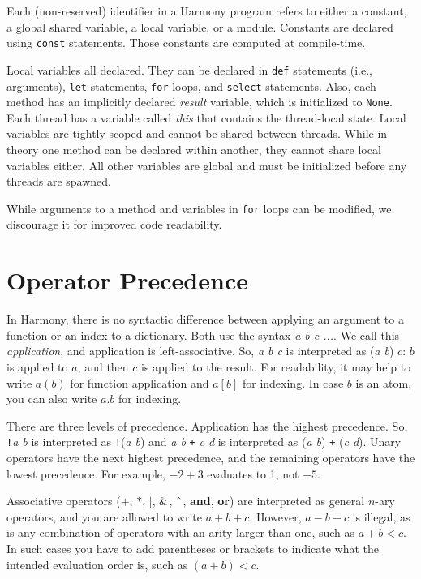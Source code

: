 \documentclass{report}
\begin{document}
Each (non-reserved) identifier in a Harmony program refers to either
a constant, a global shared variable, a local variable, or a module.
Constants are declared using \texttt{const} statements.
Those constants are computed at compile-time.

Local variables all declared.  They can be declared in
\texttt{def} statements (i.e., arguments),
\texttt{let} statements, \texttt{for} loops, and \texttt{select} statements.
Also, each method has an implicitly declared
\textit{result} variable, which is initialized to \texttt{None}.
Each thread has a variable called \textit{this} that contains
the thread-local state.
Local variables are tightly scoped and cannot be shared
between threads.
While in theory one method can be declared within another,
they cannot share local variables either.
All other variables are global and must be initialized
before any threads are spawned.

While arguments to a method and variables in \texttt{for} loops
can be modified, we discourage it for improved code readability.

\section{Operator Precedence}

In Harmony, there is no syntactic difference between applying an argument to a function
or an index to a dictionary.  Both use the syntax \textit{a b c ...}.
We call this \emph{application}, and application is left-associative.
So, \textit{a b c} is interpreted as (\textit{a b}) $c$: $b$ is applied to $a$,
and then $c$ is applied to the result.
For readability, it may help to write $a(b)$ for function application and
$a[b]$ for indexing.  In case $b$ is an atom, you can also write $a.b$ for indexing.

There are three levels of precedence.
Application has the highest precedence.  So, \texttt{!}\textit{a b} is interpreted as
\texttt{!}(\textit{a b}) and \textit{a b} \texttt{+} \textit{c d} is interpreted as
(\textit{a b}) \texttt{+} (\textit{c d}).
Unary operators have the next highest precedence,
and the remaining operators have the lowest precedence.
For example, $-2 + 3$ evaluates to 1, not $-5$.

Associative operators ($+$, $*$, $|$, $\string&$, $\string^$, \textbf{and}, \textbf{or})
are interpreted as general $n$-ary operators, and you are allowed to write
$a + b + c$.  However, $a - b - c$ is illegal, as is any combination of operators with an
arity larger than one, such as $a + b < c$.
In such cases you have to add parentheses or brackets to indicate what
the intended evaluation order is, such as $(a + b) < c$.
\end{document}
